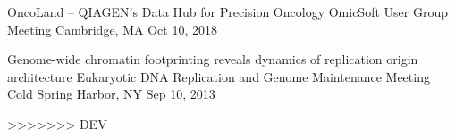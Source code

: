 

\begin{presentations}


  \presentation
    {OncoLand -- QIAGEN's Data Hub for Precision Oncology}
    {OmicSoft User Group Meeting} %
    {Cambridge, MA} %
    {Oct 10, 2018} %

  \presentation
    {Genome-wide chromatin footprinting reveals dynamics of replication origin architecture}
    {Eukaryotic DNA Replication and Genome Maintenance Meeting} %
    {Cold Spring Harbor, NY} %
    {Sep 10, 2013} %


\end{presentations}
\vspace{-2mm}
>>>>>>> DEV
